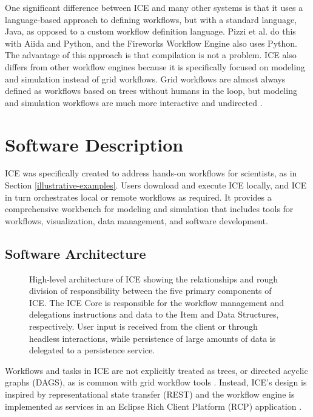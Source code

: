 One significant difference between ICE and many other systems is that it uses a language-based approach to defining workflows, but with a standard language, Java, as opposed to a custom workflow definition language. Pizzi et al. do this with Aiida and Python, and the Fireworks Workflow Engine also uses Python. The advantage of this approach is that compilation is not a problem. ICE also differs from other workflow engines because it is specifically focused on modeling and simulation instead of grid workflows. Grid workflows are almost always defined as workflows based on trees without humans in the loop, but modeling and simulation workflows are much more interactive and undirected \cite{billings_toward_2017}. 

\section{Software Description}\label{software-description}

ICE was specifically created to address hands-on workflows for scientists, as in Section \ref{illustrative-examples}. Users download and
execute ICE locally, and ICE in turn orchestrates local or remote workflows as
required. It provides a comprehensive workbench for modeling and
simulation that includes tools for workflows, visualization, data
management, and software development.

\subsection{Software Architecture}\label{software-architecture}

\begin{figure}[htbp]
\centering
{}
\caption{High-level architecture of ICE showing the relationships and rough division of responsibility between the five primary components of ICE. The ICE Core is responsible for the workflow management and delegations instructions and data to the Item and Data Structures, respectively. User input is received from the client or through headless interactions, while persistence of large amounts of data is delegated to a persistence service.}
\label{highlevel-arch}
\end{figure}

Workflows and tasks in ICE are not explicitly treated as trees, or
directed acyclic graphs (DAGS), as is common with grid workflow tools
\cite{yu_taxonomy_2005}. Instead, ICE's design is inspired by representational
state transfer (REST) and the workflow engine is implemented as services in an Eclipse Rich Client Platform (RCP) application
\cite{fielding_architectural_2000} \cite{mcaffer_eclipse_2010}.

